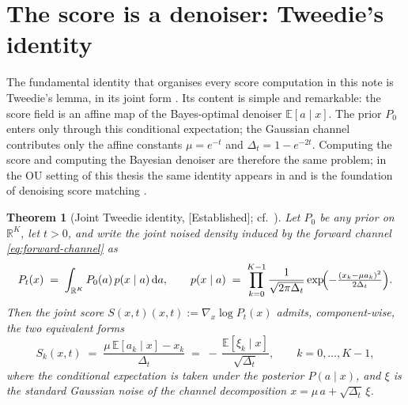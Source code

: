 \documentclass[11pt]{article}
\newtheorem{theorem}[proposition]{Theorem}
\theoremstyle{definition}
\newcommand{\R}{\mathbb{R}}
\newcommand{\E}{\mathbb{E}}
\newcommand{\Detl}{\Delta_t}
\newcommand{\score}{S(x, t)}
\newcommand{\Established}{\textcolor{black!50!green}{\textsf{[Established]}}}
\begin{document}
\section{The score is a denoiser: Tweedie's identity}\label{sec:tweedie}

The fundamental identity that organises every score computation in
this note is Tweedie's lemma, in its joint form
\citep{Efron2011, Thiery2023}. Its content is simple and remarkable:
the score field is an affine map of the Bayes-optimal denoiser
\(\E[a \mid x]\). The prior \(P_0\) enters only through this
conditional expectation; the Gaussian channel contributes only the
affine constants \(\mu = e^{-t}\) and \(\Detl = 1 - e^{-2t}\).
Computing the score and computing the Bayesian denoiser are therefore
the same problem; in the OU setting of this thesis the same identity
appears in \cite{Efron2011} and is the foundation of denoising
score matching \citep{Vincent2011}.

\begin{theorem}[Joint Tweedie identity, \Established; cf.\
\cite{Efron2011, Thiery2023}]\label{thm:tweedie}
Let \(P_0\) be any prior on \(\R^K\), let \(t > 0\), and write the
joint noised density induced by the forward channel
\eqref{eq:forward-channel} as
\begin{equation}\label{eq:Pt-def}
    P_t(x)
    \;=\;
    \int_{\R^K} P_0(a)\, p(x \mid a)\, \mathrm d a,
    \qquad
    p(x \mid a)
    \;=\;
    \prod_{k=0}^{K-1}
    \frac{1}{\sqrt{2\pi \Detl}}
    \exp\!\Bigl(-\tfrac{(x_k - \mu a_k)^2}{2 \Detl}\Bigr).
\end{equation}
Then the joint score \(\score(x, t) := \nabla_x \log P_t(x)\) admits,
component-wise, the two equivalent forms
\begin{equation}\label{eq:tweedie}
    S_k(x, t)
        \;=\; \frac{\mu\, \E[a_k \mid x] - x_k}{\Detl}
        \;=\; -\,\frac{\E[\xi_k \mid x]}{\sqrt{\Detl}},
    \qquad k = 0, \dots, K - 1,
\end{equation}
where the conditional expectation is taken under the posterior
\(P(a \mid x)\), and \(\xi\) is the standard Gaussian noise of the
channel decomposition \(x = \mu\, a + \sqrt{\Detl}\, \xi\).
\end{theorem}
\end{document}
